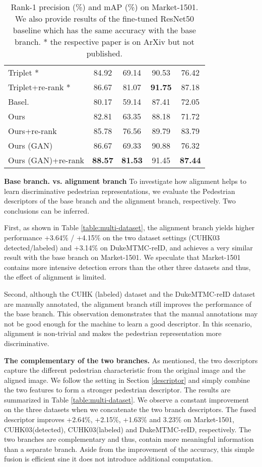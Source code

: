 \begin{table*}
\begin{center}
\begin{tabular}{l|cc|cc}
Triplet \cite{hermans2017defense}* & 84.92 & 69.14 & 90.53 & 76.42 \\
Triplet+re-rank \cite{hermans2017defense}* & 86.67 & 81.07 & \textbf{91.75} & 87.18\\
\hline
Basel.  & 80.17 & 59.14 & 87.41 & 72.05 \\
Ours & 82.81 & 63.35 & 88.18  & 71.72 \\
Ours+re-rank & 85.78 & 76.56 & 89.79 & 83.79 \\
Ours (GAN) & 86.67 & 69.33 & 90.88 & 76.32\\
Ours (GAN)+re-rank & \textbf{88.57} & \textbf{81.53} & 91.45 & \textbf{87.44}\\
\hline
\end{tabular}
\end{center}
\caption{Rank-1 precision (\%) and mAP (\%) on  Market-1501. We also provide results of the fine-tuned ResNet50 baseline which has the same accuracy with the base branch. * the respective paper is on ArXiv but not published.}
\label{table:mr}
\end{table*}

\textbf{Base branch. vs. alignment branch} To investigate how alignment helps to learn discriminative pedestrian representations, we evaluate the Pedestrian descriptors of the base branch and the alignment branch, respectively. Two conclusions can be inferred. 

First, as shown in Table \ref{table:multi-dataset}, the alignment branch yields higher performance \ie +3.64\% / +4.15\% on the two dataset settings (CUHK03 detected/labeled) and +3.14\% on DukeMTMC-reID,  and achieves a very similar result with the base branch on Market-1501. We speculate that Market-1501 contains more intensive detection errors than the other three datasets and thus, the effect of alignment is limited. 

Second, although the CUHK (labeled) dataset and the DukeMTMC-reID dataset are manually annotated, the alignment branch still improves the performance of the base branch. This observation demonstrates that the manual annotations may not be good enough for the machine to learn a good descriptor. In this scenario, alignment is non-trivial and makes the pedestrian representation more discriminative. 

\textbf{The complementary of the two branches.} As mentioned, the two descriptors capture the different pedestrian characteristic from the original image and the aligned image. We follow the setting in Section \ref{descriptor} and simply combine the two features to form a stronger pedestrian descriptor. The results are summarized in Table \ref{table:multi-dataset}. We observe a constant improvement on the three datasets when we concatenate the two branch descriptors. The fused descriptor improves +2.64\%, +2.15\%, +1.63\% and 3.23\% on Market-1501, CUHK03(detected), CUHK03(labeled) and DukeMTMC-reID, respectively. The two branches are complementary and thus, contain more meaningful information than a separate branch. Aside from the improvement of the accuracy, this simple fusion is efficient sine it does not introduce additional computation.

